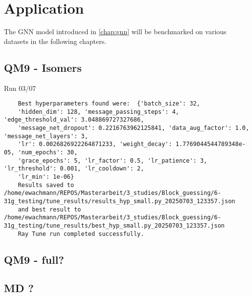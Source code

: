 \chapter{Application}
\label{chap:application}
The GNN model introduced in \autoref{chap:gnn} will be benchmarked on various datasets in the following chapters. 

\section{QM9 -  Isomers}
\label{sec:qm9_isomers_benchmark}

Run 03/07
\begin{verbatim}
    Best hyperparameters found were:  {'batch_size': 32, 
    'hidden_dim': 128, 'message_passing_steps': 4, 'edge_threshold_val': 3.048869727327686, 
    'message_net_dropout': 0.2216763962125841, 'data_aug_factor': 1.0, 'message_net_layers': 3, 
    'lr': 0.0026826922264871233, 'weight_decay': 1.7769044544789348e-05, 'num_epochs': 30, 
    'grace_epochs': 5, 'lr_factor': 0.5, 'lr_patience': 3, 'lr_threshold': 0.001, 'lr_cooldown': 2, 
    'lr_min': 1e-06}
    Results saved to /home/ewachmann/REPOS/Masterarbeit/3_studies/Block_guessing/6-31g_testing/tune_results/results_hyp_small.py_20250703_123357.json 
    and best result to /home/ewachmann/REPOS/Masterarbeit/3_studies/Block_guessing/6-31g_testing/tune_results/best_hyp_small.py_20250703_123357.json
    Ray Tune run completed successfully.
\end{verbatim}


\section{QM9 - full?}
\label{sec:qm9_isomers_benchmark}

\section{MD ? }
\label{sec:qm9_isomers_benchmark}
